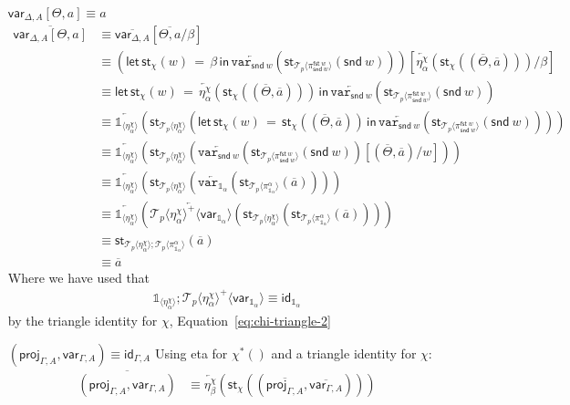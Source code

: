 \documentclass[10pt]{article}
\theoremstyle{definition}
\newcommand\dsd[1]{\ensuremath{\mathsf{#1}}}
\newcommand{\app}[2]{\ensuremath{#1 \: #2}}
\newcommand{\fst}[1]{\app{\dsd{fst}}{#1}}
\newcommand{\snd}[1]{\app{\dsd{snd}}{#1}}
\newcommand{\id}{\mathsf{id}}
\newcommand{\rewrite}[2]{\overleftarrow{#1}(#2)}
\newcommand\St[2]{\ensuremath{{#1}^*(#2)}}
\newcommand\StI[2]{\ensuremath{\mathsf{st}_{#1}(#2)}}
\newcommand\StE[4]{\ensuremath{\mathsf{let} \, \StI{#1}{#3} \, = \, {#2} \, \mathsf{in} \, #4}}
\newcommand\ApEl[2]{\mathcal{T}_{#1}\langle#2\rangle}
\newcommand\ApPlus[2]{\ensuremath{{#1}^+ \langle #2 \rangle }}
\newcommand{\upstairs}[1]{\overline{#1}}
\newcommand\proj[1]{\ensuremath{\mathsf{proj}_{#1}}}
\newcommand\qvar[1]{\ensuremath{\mathsf{var}_{#1}}}
\newcommand\One{\ensuremath{\mathds{1}}}
\newcommand\var[1]{\ensuremath{\mathtt{var}_{#1}}}
\newcommand\ApOne[1]{\ensuremath{\One_{\langle {#1} \rangle }}}
\begin{document}
\begin{enumerate}[style = multiline, labelwidth = 80pt]
\item[{$\qvar{\Delta,A}[\Theta, a] \equiv a$}] 
\begin{align*}
\upstairs{\qvar{\Delta,A}[\Theta, a]} 
&\equiv \upstairs{\qvar{\Delta,A}}[\upstairs{\Theta, a}/\beta] \\
&\equiv (\StE{\chi}{\beta}{w}{\rewrite{\var{\snd w}}{\StI{\ApEl{p}{\pi^{\fst w}_{\snd w}}}{\snd w}}})[\rewrite{\eta^\chi_{\alpha}}{\StI{\chi}{(\upstairs{\Theta}, \upstairs{a})}}/\beta] \\
&\equiv \StE{\chi}{\rewrite{\eta^\chi_{\alpha}}{\StI{\chi}{(\upstairs{\Theta}, \upstairs{a})}}}{w}{\rewrite{\var{\snd w}}{\StI{\ApEl{p}{\pi^{\fst w}_{\snd w}}}{\snd w}}} \\
&\equiv \rewrite{\One_{\langle \eta^\chi_\alpha \rangle}}{\StI{\ApEl{p}{\eta^\chi_\alpha}}{\StE{\chi}{\StI{\chi}{(\upstairs{\Theta}, \upstairs{a})}}{w}{\rewrite{\var{\snd w}}{\StI{\ApEl{p}{\pi^{\fst w}_{\snd w}}}{\snd w}}}}} \\
&\equiv \rewrite{\One_{\langle \eta^\chi_\alpha \rangle}}{\StI{\ApEl{p}{\eta^\chi_\alpha}}{\rewrite{\var{\snd w}}{\StI{\ApEl{p}{\pi^{\fst w}_{\snd w}}}{\snd w}}[(\upstairs{\Theta}, \upstairs{a})/w]}} \\
&\equiv \rewrite{\One_{\langle \eta^\chi_\alpha \rangle}}{\StI{\ApEl{p}{\eta^\chi_\alpha}}{\rewrite{\var{\One_\alpha}}{\StI{\ApEl{p}{\pi^{\alpha}_{\One_\alpha}}}{\upstairs{a}}}}} \\
&\equiv \rewrite{\One_{\langle \eta^\chi_\alpha \rangle}}{\rewrite{\ApPlus{\ApEl{p}{\eta^\chi_\alpha}}{\qvar{\One_\alpha}}}{\StI{\ApEl{p}{\eta^\chi_\alpha}}{\StI{\ApEl{p}{\pi^{\alpha}_{\One_\alpha}}}{\upstairs{a}}}}} \\
&\equiv \StI{\ApEl{p}{\eta^\chi_\alpha};\ApEl{p}{\pi^{\alpha}_{\One_\alpha}}}{\upstairs{a}} \\
&\equiv \upstairs{a}
\end{align*}
Where we have used that
\begin{align*}
\ApOne{\eta^\chi_\alpha};\ApPlus{\ApEl{p}{\eta^\chi_\alpha}}{\qvar{\One_\alpha}} \equiv \id_{\One_\alpha}
\end{align*}
by the triangle identity for $\chi$, Equation~\eqref{eq:chi-triangle-2}
\item[{$(\proj{\Gamma,A}, \qvar{\Gamma,A}) \equiv \id_{\Gamma, A}$}] Using eta for $\St{\chi}{}$ and a triangle identity for $\chi$:
\begin{align*}
\upstairs{(\proj{\Gamma,A}, \qvar{\Gamma,A})}
&\equiv \rewrite{\eta^\chi_{\beta}}{\StI{\chi}{(\upstairs{\proj{\Gamma,A}}, \upstairs{\qvar{\Gamma,A}})}} \\

\end{align*}
\end{enumerate}
\end{document}
